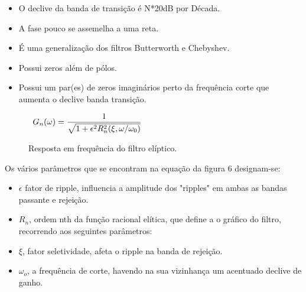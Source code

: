 \documentclass{article}
\begin{document}
    
\raggedright
\vspace{5mm} %
\begin{itemize}
\item{O declive da banda de transição é  N*20dB por Década.}
\item{A fase pouco se assemelha a uma reta.}
\item{É uma generalização dos filtros Butterworth e Chebyshev.}
\item{Possui zeros além de pólos.}
\item{Possui um par(es) de zeros imaginários perto da frequência corte que aumenta o declive banda transição.}
\end{itemize}
   
\raggedright
\vspace{5mm} %
    
\begin{figure}
\begin{center}

\ $
{\displaystyle G_{n}(\omega)={1 \over {\sqrt {1+\epsilon ^{2}R_{n}^{2}(\xi ,\omega /\omega _{0})}}}}$
\caption{Resposta em frequência do filtro elíptico.}

\end{center}
\end{figure}
    
\raggedright
\vspace{5mm} %
 
Os vários parâmetros que se encontram na equação da figura 6 designam-se:

\begin{itemize}
\item{$\epsilon$ fator de ripple, influencia a amplitude dos "ripples" em ambas as bandas passante e rejeição. \\}
\item{$R_n$, ordem nth da função racional elítica, que define a o gráfico do filtro, recorrendo aos seguintes parâmetros: \\}
\item{$\xi$, fator seletividade, afeta o ripple na banda de rejeição.\\}
\item{$\omega_o$, a frequência de corte, havendo na sua vizinhança um acentuado declive de ganho.  \\}
\end{itemize}
\end{document}
